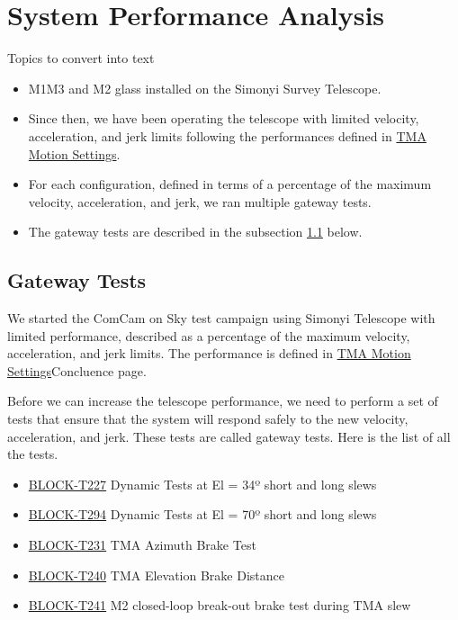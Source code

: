\section{System Performance Analysis}
\label{sec:system_performance_analysis}

\newcommand{\TMAMotionSettings}{\href{https://rubinobs.atlassian.net/wiki/spaces/LSSTCOM/pages/53741249/TMA+Motion+Settings}{TMA Motion Settings}}
\newcommand{\testCase}[1]{\href{https://rubinobs.atlassian.net/projects/BLOCK?selectedItem=com.atlassian.plugins.atlassian-connect-plugin:com.kanoah.test-manager__main-project-page#!/v2/testCase/#1}{#1}}

Topics to convert into text

\begin{itemize}
    \item M1M3 and M2 glass installed on the Simonyi Survey Telescope.
    \item Since then, we have been operating the telescope with limited velocity,
    acceleration, and jerk limits following the performances defined in \TMAMotionSettings.
    \item For each configuration, defined in terms of a percentage of the maximum
    velocity, acceleration, and jerk, we ran multiple gateway tests.
    \item The gateway tests are described in the subsection \ref{subsec:gateway_tests} below.
\end{itemize}

\subsection{Gateway Tests}
\label{subsec:gateway_tests}

We started the ComCam on Sky test campaign using Simonyi Telescope with limited
performance, described as a percentage of the maximum velocity, acceleration,
and jerk limits. The performance is defined in \TMAMotionSettings Concluence page.

Before we can increase the telescope performance, we need to perform a set of
tests that ensure that the system will respond safely to the new velocity, acceleration,
and jerk. These tests are called gateway tests. Here is the list of all the tests.

\begin{itemize}
    \item \testCase{BLOCK-T227} Dynamic Tests at El = 34º short and long slews
    \item \testCase{BLOCK-T294} Dynamic Tests at El = 70º short and long slews
    \item \testCase{BLOCK-T231} TMA Azimuth Brake Test
    \item \testCase{BLOCK-T240} TMA Elevation Brake Distance
    \item \testCase{BLOCK-T241} M2 closed-loop break-out brake test during TMA slew
\end{itemize}


